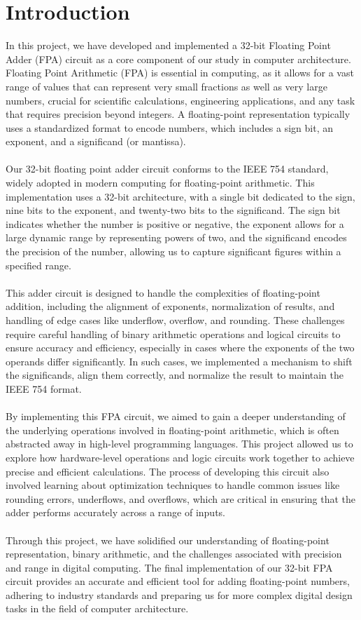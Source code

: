 \documentclass{article}
\begin{document}
\section{Introduction}
In this project, we have developed and implemented a 32-bit Floating Point Adder (FPA) circuit as a core component of our study in computer architecture. Floating Point Arithmetic (FPA) is essential in computing, as it allows for a vast range of values that can represent very small fractions as well as very large numbers, crucial for scientific calculations, engineering applications, and any task that requires precision beyond integers. A floating-point representation typically uses a standardized format to encode numbers, which includes a sign bit, an exponent, and a significand (or mantissa).
\\ \\
Our 32-bit floating point adder circuit conforms to the IEEE 754 standard, widely adopted in modern computing for floating-point arithmetic. This implementation uses a 32-bit architecture, with a single bit dedicated to the sign, nine bits to the exponent, and twenty-two bits to the significand. The sign bit indicates whether the number is positive or negative, the exponent allows for a large dynamic range by representing powers of two, and the significand encodes the precision of the number, allowing us to capture significant figures within a specified range.
\\ \\ 
This adder circuit is designed to handle the complexities of floating-point addition, including the alignment of exponents, normalization of results, and handling of edge cases like underflow, overflow, and rounding. These challenges require careful handling of binary arithmetic operations and logical circuits to ensure accuracy and efficiency, especially in cases where the exponents of the two operands differ significantly. In such cases, we implemented a mechanism to shift the significands, align them correctly, and normalize the result to maintain the IEEE 754 format.
\\ \\ 
By implementing this FPA circuit, we aimed to gain a deeper understanding of the underlying operations involved in floating-point arithmetic, which is often abstracted away in high-level programming languages. This project allowed us to explore how hardware-level operations and logic circuits work together to achieve precise and efficient calculations. The process of developing this circuit also involved learning about optimization techniques to handle common issues like rounding errors, underflows, and overflows, which are critical in ensuring that the adder performs accurately across a range of inputs.
\\ \\ 
Through this project, we have solidified our understanding of floating-point representation, binary arithmetic, and the challenges associated with precision and range in digital computing. The final implementation of our 32-bit FPA circuit provides an accurate and efficient tool for adding floating-point numbers, adhering to industry standards and preparing us for more complex digital design tasks in the field of computer architecture.
\end{document}
